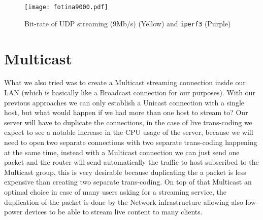 \documentclass{exam}
\begin{document}
\begin{figure}
    \centering
    \texttt{[image: fotina9000.pdf]}    
    \caption{Bit-rate of UDP streaming (9Mb/s) (Yellow) and \texttt{iperf3} (Purple)}
    \label{fig:udp-iperf3}
\end{figure}

\section{Multicast}
What we also tried was to create a Multicast streaming connection inside our LAN (which is basically like a Broadcast connection for our purposes). With our previous approaches we can only establish a Unicast connection with a single host, but what would happen if we had more than one host to stream to? Our server will have to duplicate the connections, in the case of live trans-coding we expect to see a notable increase in the CPU usage of the server, because we will need to open two separate connections with two separate trans-coding happening at the same time, instead with a Multicast connection we can just send one packet and the router will send automatically the traffic to host subscribed to the Multicast group, this is very desirable because duplicating the a packet is less expensive than creating two separate trans-coding. On top of that Multicast an optimal choice in case of many users asking for a streaming service, the duplication of the packet is done by the Network infrastructure allowing also low-power devices to be able to stream live content to many clients.
\end{document}
